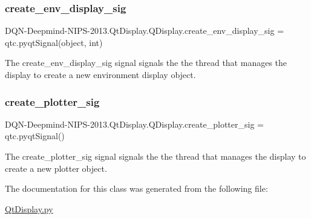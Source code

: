\subsubsection{\texorpdfstring{create\+\_\+env\+\_\+display\+\_\+sig}{create\_env\_display\_sig}}
{\footnotesize\ttfamily D\+QN-\/Deepmind-\/N\+I\+PS-\/2013.Qt\+Display.\+Q\+Display.\+create\+\_\+env\+\_\+display\+\_\+sig = qtc.\+pyqt\+Signal(object, int)\hspace{0.3cm}{\ttfamily [static]}}



The create\+\_\+env\+\_\+display\+\_\+sig signal signals the the thread that manages the display to create a new environment display object. 

\hypertarget{classDQN-Deepmind-NIPS-2013_1_1QtDisplay_1_1QDisplay_a9fce093a7c41ba05405ccdea20f542ad}{}\label{classDQN-Deepmind-NIPS-2013_1_1QtDisplay_1_1QDisplay_a9fce093a7c41ba05405ccdea20f542ad} 
\subsubsection{\texorpdfstring{create\+\_\+plotter\+\_\+sig}{create\_plotter\_sig}}
{\footnotesize\ttfamily D\+QN-\/Deepmind-\/N\+I\+PS-\/2013.Qt\+Display.\+Q\+Display.\+create\+\_\+plotter\+\_\+sig = qtc.\+pyqt\+Signal()\hspace{0.3cm}{\ttfamily [static]}}



The create\+\_\+plotter\+\_\+sig signal signals the the thread that manages the display to create a new plotter object. 



The documentation for this class was generated from the following file\+:\begin{DoxyCompactItemize}
\item 
\hyperlink{QtDisplay_8py}{Qt\+Display.\+py}\end{DoxyCompactItemize}
